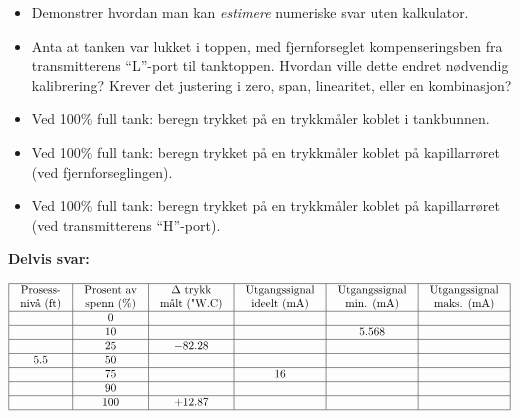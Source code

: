\begin{itemize}
\item{} Demonstrer hvordan man kan {\it estimere} numeriske svar uten kalkulator.
\item{} Anta at tanken var lukket i toppen, med fjernforseglet kompenseringsben fra transmitterens ``L''-port til tanktoppen.  Hvordan ville dette endret nødvendig kalibrering?  Krever det justering i zero, span, linearitet, eller en kombinasjon?
\item{} Ved 100\% full tank: beregn trykket på en trykkmåler koblet i tankbunnen.
\item{} Ved 100\% full tank: beregn trykket på en trykkmåler koblet på kapillarrøret (ved fjernforseglingen).
\item{} Ved 100\% full tank: beregn trykket på en trykkmåler koblet på kapillarrøret (ved transmitterens ``H''-port).
\end{itemize}







\noindent
{\bf Delvis svar:}


$$\vbox{\offinterlineskip
\halign{\strut
\vrule \quad\hfil # \ \hfil & 
\vrule \quad\hfil # \ \hfil & 
\vrule \quad\hfil # \ \hfil & 
\vrule \quad\hfil # \ \hfil & 
\vrule \quad\hfil # \ \hfil & 
\vrule \quad\hfil # \ \hfil \vrule \cr
\noalign{\hrule}
%
Prosess- & Prosent av & $\Delta$ trykk & Utgangssignal & Utgangssignal & Utgangssignal \cr
%
nivå (ft) & spenn (\%) & målt ("W.C) & ideelt (mA) & min. (mA) & maks. (mA) \cr
%
\noalign{\hrule}
%
  & 0 &  &  &  &  \cr
%
\noalign{\hrule}
%
  & 10 &  &  & 5.568 &  \cr
%
\noalign{\hrule}
%
  & 25 & $-82.28$ &  &  &  \cr
%
\noalign{\hrule}
%
5.5  & 50 &  &  &  &  \cr
%
\noalign{\hrule}
%
  & 75 &  & 16 &  &  \cr
%
\noalign{\hrule}
%
  & 90 &  &  &  &  \cr
%
\noalign{\hrule}
%
  & 100 & +12.87 &  &  &  \cr
%
\noalign{\hrule}
} %
}$$ %







